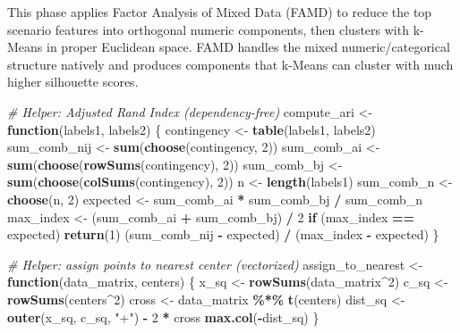 \documentclass[
]{article}
\newenvironment{Shaded}{\begin{snugshade}}{\end{snugshade}}
\newcommand{\CommentTok}[1]{\textcolor[rgb]{0.56,0.35,0.01}{\textit{#1}}}
\newcommand{\ControlFlowTok}[1]{\textcolor[rgb]{0.13,0.29,0.53}{\textbf{#1}}}
\newcommand{\DecValTok}[1]{\textcolor[rgb]{0.00,0.00,0.81}{#1}}
\newcommand{\FunctionTok}[1]{\textcolor[rgb]{0.13,0.29,0.53}{\textbf{#1}}}
\newcommand{\NormalTok}[1]{#1}
\newcommand{\OtherTok}[1]{\textcolor[rgb]{0.56,0.35,0.01}{#1}}
\newcommand{\SpecialCharTok}[1]{\textcolor[rgb]{0.81,0.36,0.00}{\textbf{#1}}}
\newcommand{\StringTok}[1]{\textcolor[rgb]{0.31,0.60,0.02}{#1}}
\begin{document}
This phase applies Factor Analysis of Mixed Data (FAMD) to reduce the
top scenario features into orthogonal numeric components, then clusters
with k-Means in proper Euclidean space. FAMD handles the mixed
numeric/categorical structure natively and produces components that
k-Means can cluster with much higher silhouette scores.

\begin{Shaded}
\begin{Highlighting}[]
\CommentTok{\# Helper: Adjusted Rand Index (dependency{-}free)}
\NormalTok{compute\_ari }\OtherTok{\textless{}{-}} \ControlFlowTok{function}\NormalTok{(labels1, labels2) \{}
\NormalTok{  contingency }\OtherTok{\textless{}{-}} \FunctionTok{table}\NormalTok{(labels1, labels2)}
\NormalTok{  sum\_comb\_nij }\OtherTok{\textless{}{-}} \FunctionTok{sum}\NormalTok{(}\FunctionTok{choose}\NormalTok{(contingency, }\DecValTok{2}\NormalTok{))}
\NormalTok{  sum\_comb\_ai  }\OtherTok{\textless{}{-}} \FunctionTok{sum}\NormalTok{(}\FunctionTok{choose}\NormalTok{(}\FunctionTok{rowSums}\NormalTok{(contingency), }\DecValTok{2}\NormalTok{))}
\NormalTok{  sum\_comb\_bj  }\OtherTok{\textless{}{-}} \FunctionTok{sum}\NormalTok{(}\FunctionTok{choose}\NormalTok{(}\FunctionTok{colSums}\NormalTok{(contingency), }\DecValTok{2}\NormalTok{))}
\NormalTok{  n }\OtherTok{\textless{}{-}} \FunctionTok{length}\NormalTok{(labels1)}
\NormalTok{  sum\_comb\_n }\OtherTok{\textless{}{-}} \FunctionTok{choose}\NormalTok{(n, }\DecValTok{2}\NormalTok{)}
\NormalTok{  expected  }\OtherTok{\textless{}{-}}\NormalTok{ sum\_comb\_ai }\SpecialCharTok{*}\NormalTok{ sum\_comb\_bj }\SpecialCharTok{/}\NormalTok{ sum\_comb\_n}
\NormalTok{  max\_index }\OtherTok{\textless{}{-}}\NormalTok{ (sum\_comb\_ai }\SpecialCharTok{+}\NormalTok{ sum\_comb\_bj) }\SpecialCharTok{/} \DecValTok{2}
  \ControlFlowTok{if}\NormalTok{ (max\_index }\SpecialCharTok{==}\NormalTok{ expected) }\FunctionTok{return}\NormalTok{(}\DecValTok{1}\NormalTok{)}
\NormalTok{  (sum\_comb\_nij }\SpecialCharTok{{-}}\NormalTok{ expected) }\SpecialCharTok{/}\NormalTok{ (max\_index }\SpecialCharTok{{-}}\NormalTok{ expected)}
\NormalTok{\}}

\CommentTok{\# Helper: assign points to nearest center (vectorized)}
\NormalTok{assign\_to\_nearest }\OtherTok{\textless{}{-}} \ControlFlowTok{function}\NormalTok{(data\_matrix, centers) \{}
\NormalTok{  x\_sq   }\OtherTok{\textless{}{-}} \FunctionTok{rowSums}\NormalTok{(data\_matrix}\SpecialCharTok{\^{}}\DecValTok{2}\NormalTok{)}
\NormalTok{  c\_sq   }\OtherTok{\textless{}{-}} \FunctionTok{rowSums}\NormalTok{(centers}\SpecialCharTok{\^{}}\DecValTok{2}\NormalTok{)}
\NormalTok{  cross  }\OtherTok{\textless{}{-}}\NormalTok{ data\_matrix }\SpecialCharTok{\%*\%} \FunctionTok{t}\NormalTok{(centers)}
\NormalTok{  dist\_sq }\OtherTok{\textless{}{-}} \FunctionTok{outer}\NormalTok{(x\_sq, c\_sq, }\StringTok{"+"}\NormalTok{) }\SpecialCharTok{{-}} \DecValTok{2} \SpecialCharTok{*}\NormalTok{ cross}
  \FunctionTok{max.col}\NormalTok{(}\SpecialCharTok{{-}}\NormalTok{dist\_sq)}
\NormalTok{\}}
\end{Highlighting}
\end{Shaded}
\end{document}
